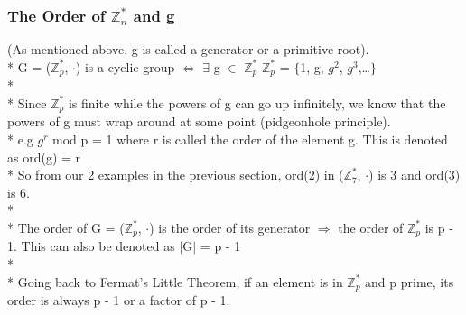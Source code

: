 \documentclass[11pt]{article}
\begin{document}
\subsubsection{The Order of $\mathbb{Z}^*_n$ and g}
(As mentioned above, g is called a generator or a
primitive root).\\*
G = ($\mathbb{Z}^*_{p}$, $\cdot$) is a cyclic group $\Longleftrightarrow$ $\exists$ g
$\in$ $\mathbb{Z}^*_{p}$  $\mathbb{Z}^*_{p}$ = $\{$1,
g, $g^2$, $g^3$,\ldots$\}$\\*\\*
Since $\mathbb{Z}^*_{p}$ is finite while the powers of g
can go up infinitely, we know that the powers of g must wrap around at some
point (pidgeonhole principle).\\*
e.g $g^r$ mod p = 1 where r is called the order of the element g.  This is
denoted as ord(g) = r\\*
So from our 2 examples in the previous section, ord(2) in ($\mathbb{Z}^*_7$, $\cdot$)
is 3 and ord(3) is 6.\\*\\*
The order of G = ($\mathbb{Z}^*_p$, $\cdot$) is the order of its generator
$\Rightarrow$ the order of $\mathbb{Z}^*_p$ is p - 1.  This can also be denoted
as $\lvert$G$\rvert$ = p - 1\\*\\*
Going back to Fermat's Little Theorem, if an element is in
$\mathbb{Z}^*_p$ and p prime, its order is always p - 1 or a factor of p - 1.
\end{document}
